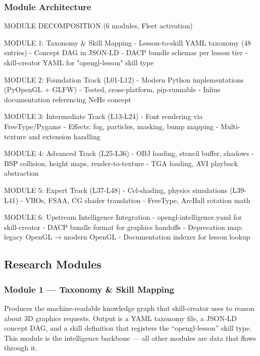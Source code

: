 \documentclass[11pt,letterpaper]{article}
\begin{document}
\subsubsection{Module Architecture}

\begin{asciibox}
MODULE DECOMPOSITION (6 modules, Fleet activation)

MODULE 1: Taxonomy & Skill Mapping
  - Lesson-to-skill YAML taxonomy (48 entries)
  - Concept DAG in JSON-LD
  - DACP bundle schemas per lesson tier
  - skill-creator YAML for "opengl-lesson" skill type

MODULE 2: Foundation Track (L01-L12)
  - Modern Python implementations (PyOpenGL + GLFW)
  - Tested, cross-platform, pip-runnable
  - Inline documentation referencing NeHe concept

MODULE 3: Intermediate Track (L13-L24)
  - Font rendering via FreeType/Pygame
  - Effects: fog, particles, masking, bump mapping
  - Multi-texture and extension handling

MODULE 4: Advanced Track (L25-L36)
  - OBJ loading, stencil buffer, shadows
  - BSP collision, height maps, render-to-texture
  - TGA loading, AVI playback abstraction

MODULE 5: Expert Track (L37-L48)
  - Cel-shading, physics simulations (L39-L41)
  - VBOs, FSAA, CG shader translation
  - FreeType, ArcBall rotation math

MODULE 6: Upstream Intelligence Integration
  - opengl-intelligence.yaml for skill-creator
  - DACP bundle format for graphics handoffs
  - Deprecation map: legacy OpenGL → modern OpenGL
  - Documentation indexer for lesson lookup
\end{asciibox}

\subsection{Research Modules}

\subsubsection{Module 1 --- Taxonomy \& Skill Mapping}

Produces the machine-readable knowledge graph that skill-creator uses to reason about 3D graphics requests. Output is a YAML taxonomy file, a JSON-LD concept DAG, and a skill definition that registers the ``opengl-lesson'' skill type. This module is the intelligence backbone --- all other modules are data that flows through it.
\end{document}
